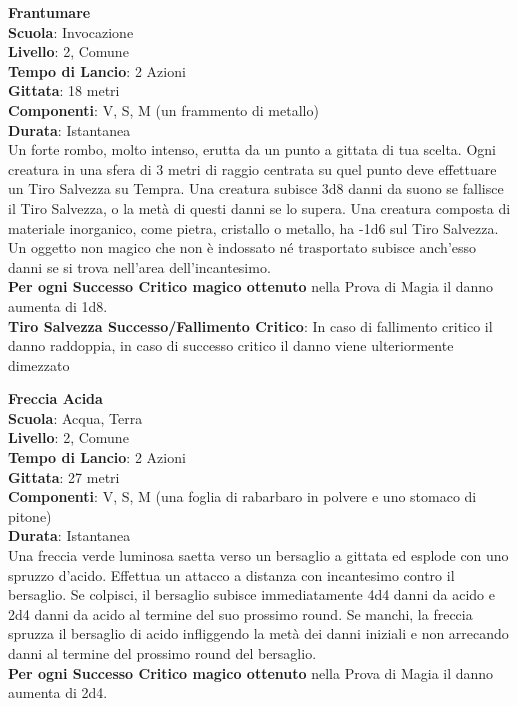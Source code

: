 \begin{multicols}{2}
\medskip\textbf{Frantumare}\\
\textbf{Scuola}: Invocazione\\
\textbf{Livello}: 2, Comune\\
\textbf{Tempo di Lancio}: 2 Azioni\\
\textbf{Gittata}: 18 metri\\
\textbf{Componenti}: V, S, M (un frammento di metallo)\\
\textbf{Durata}: Istantanea\\
Un forte rombo, molto intenso, erutta da un punto a gittata di tua scelta. Ogni creatura in una sfera di 3 metri di raggio centrata su quel punto deve effettuare un Tiro Salvezza su Tempra. Una creatura subisce 3d8 danni da suono se fallisce il Tiro Salvezza, o la metà di questi danni se lo supera. Una creatura composta di materiale inorganico, come pietra, cristallo o metallo, ha -1d6 sul Tiro Salvezza. Un oggetto non magico che non è indossato né trasportato subisce anch'esso danni se si trova nell'area dell'incantesimo.\\
\textbf{Per ogni Successo Critico magico ottenuto} nella Prova di Magia il danno aumenta di 1d8.\\
\textbf{Tiro Salvezza Successo/Fallimento Critico}: In caso di fallimento critico il danno raddoppia, in caso di successo critico il danno viene ulteriormente dimezzato

\medskip\textbf{Freccia Acida}\\
\textbf{Scuola}: Acqua, Terra\\
\textbf{Livello}: 2, Comune\\
\textbf{Tempo di Lancio}: 2 Azioni\\
\textbf{Gittata}: 27 metri\\
\textbf{Componenti}: V, S, M (una foglia di rabarbaro in polvere e uno stomaco di pitone)\\
\textbf{Durata}: Istantanea\\
Una freccia verde luminosa saetta verso un bersaglio a gittata ed esplode con uno spruzzo d'acido. Effettua un attacco a distanza con incantesimo contro il bersaglio. Se colpisci, il bersaglio subisce immediatamente 4d4 danni da acido e 2d4 danni da acido al termine del suo prossimo round. Se manchi, la freccia spruzza il bersaglio di acido infliggendo la metà dei danni iniziali e non arrecando danni al termine del prossimo round del bersaglio.\\
\textbf{Per ogni Successo Critico magico ottenuto} nella Prova di Magia il danno aumenta di 2d4.


\end{multicols}
